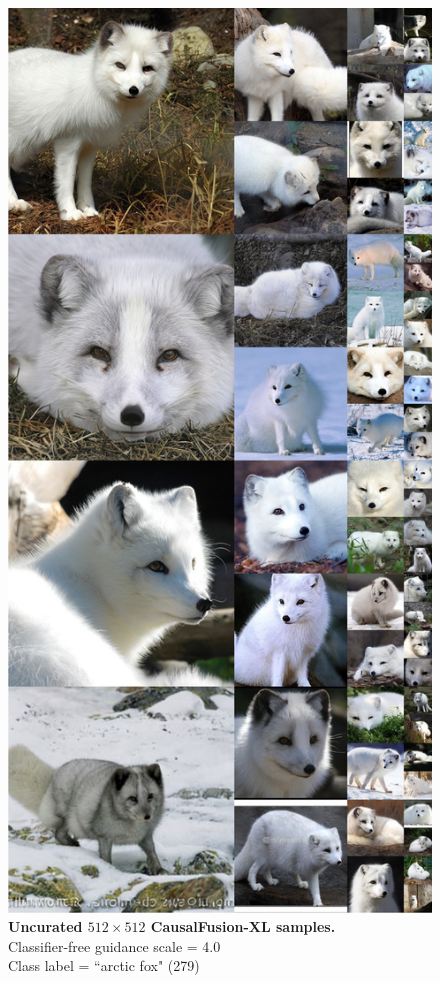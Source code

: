 \begin{figure}\centering
\includegraphics[width=\linewidth]{figs/xl512_279_cfg2.0.jpg}
\caption{\textbf{Uncurated $512\times512$ CausalFusion-XL samples.} \\Classifier-free guidance scale = 4.0\\Class label = ``arctic fox" (279)}\vspace{-2mm}
\label{fig:samples512_5}
\end{figure}

